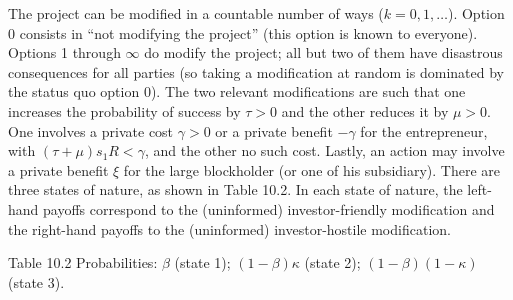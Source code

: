 \documentclass[11pt,a4paper]{article}
\begin{document}
The project can be modified in a countable number of ways (\(k = 0, 1, \ldots\)). Option 0 consists
in ``not modifying the project'' (this option is known to everyone). Options 1 through \(\infty\) do
modify the project; all but two of them have disastrous consequences for all parties (so taking a
modification at random is dominated by the status quo option 0). The two relevant modifications are
such that one increases the probability of success by \(\tau > 0\) and the other reduces it by
\(\mu > 0\). One involves a private cost \(\gamma > 0\) or a private benefit \(-\gamma\) for the
entrepreneur, with \((\tau + \mu)s_1 R < \gamma\), and the other no such cost. Lastly, an action may
involve a private benefit \(\xi\) for the large blockholder (or one of his subsidiary). There are
three states of nature, as shown in Table 10.2. In each state of nature, the left-hand payoffs
correspond to the (uninformed) investor-friendly modification and the right-hand payoffs to the
(uninformed) investor-hostile modification.

Table 10.2 Probabilities: \(\beta\) (state 1); \((1-\beta)\kappa\) (state 2);
\((1-\beta)(1-\kappa)\) (state 3).
\end{document}
